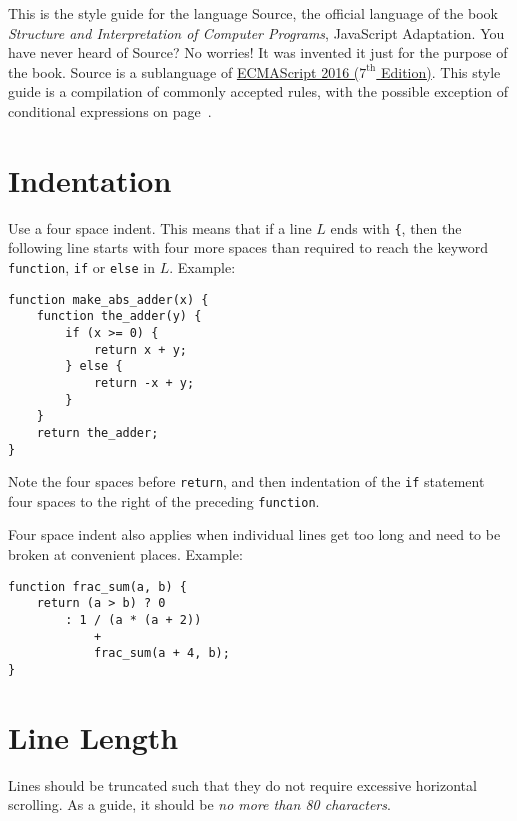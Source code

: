 



This is the style guide for the language Source,
the official language of the book \emph{Structure and Interpretation
of Computer Programs}, JavaScript Adaptation.
You have never heard of Source? No worries! It was invented
it just for the purpose of the book. Source is a sublanguage of 
\href{http://www.ecma-international.org/publications/files/ECMA-ST/Ecma-262.pdf}{
ECMAScript 2016 ($7^{\textrm{th}}$ Edition)}. This style guide is a compilation
of commonly accepted rules, with the possible exception of conditional expressions
on page~\pageref{condex}.
        
\section*{Indentation}
  Use a four space indent. This means that if a line $L$ ends with \verb#{#, then 
the following line starts with four more spaces than required to reach the keyword
\lstinline{function}, \lstinline{if} or \lstinline{else} in $L$.
Example:
\begin{lstlisting}
function make_abs_adder(x) {
    function the_adder(y) {
        if (x >= 0) {
            return x + y;
        } else {
            return -x + y;
        }
    }
    return the_adder;
}
\end{lstlisting}
Note the four spaces before \lstinline{return}, and then indentation of the \lstinline{if}
statement four spaces to the right of the preceding \lstinline{function}.

Four space indent also applies when individual lines get too long and
need to be broken at convenient places. Example:
\begin{lstlisting}
function frac_sum(a, b) {
    return (a > b) ? 0
        : 1 / (a * (a + 2))
            +
            frac_sum(a + 4, b);
}
\end{lstlisting}

\section*{Line Length}
  Lines should be truncated such that they do not require excessive horizontal scrolling.
  As a guide, it should be \emph{no more than 80 characters}.
  
